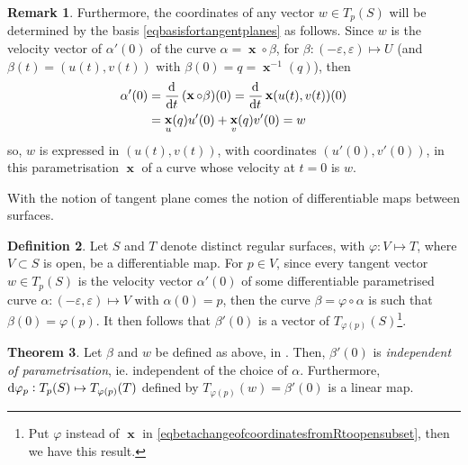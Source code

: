\documentclass{amsart} %
\renewcommand{\epsilon}{\varepsilon}
\theoremstyle{mytheoremstyle}
\theoremstyle{definition}
\newtheorem{definition}{Definition}[section]
\newtheorem{theorem}[definition]{Theorem}
\newtheorem{remark}[definition]{Remark}
\numberwithin{equation}{section}
\DeclareMathOperator{\1}{\mathbbm{1}}
\DeclareMathOperator{\D}{\dif}
\DeclareMathOperator{\x}{\mathbf{x}}
\renewcommand{\epsilon}{\varepsilon}
\renewcommand{\phi}{\varphi}
\renewcommand{\epsilon}{\varepsilon}
\renewcommand{\phi}{\varphi}
\begin{document}
\begin{remark}
	Furthermore, the coordinates of any vector $w \in T_p (S)$ will be determined by the basis \eqref{eqbasisfortangentplanes} as follows. Since $w$ is the velocity vector of $\alpha'(0)$ of the curve $\alpha = \x \circ \beta$, for $\beta:(-\epsilon,\epsilon) \mapsto U$ (and $\beta(t) = (u(t),v(t))$ with $\beta(0) = q = \x^{-1}(q)$), then
	\begin{align}
		\nonumber \alpha'(0) &= \dod{}{t} (\x \circ \beta) (0) = \dod{}{t} \x( u(t), v(t) ) (0)  \\
		\label{eqwincoordinatechartsbasis} &= \x_u (q) u'(0) + \x_v (q) v'(0) = w
	\end{align}
	so, $w $ is expressed in $(u(t),v(t))$, with coordinates $(u'(0),v'(0))$, in this parametrisation $\x$ of a curve whose velocity at $t=0$ is $w$.
\end{remark}

With the notion of tangent plane comes the notion of differentiable maps between surfaces.

\begin{definition}
	\label{defdifferentialmapsbetweensurfaces}
	Let $S$ and $T$ denote distinct regular surfaces, with $\phi: V \mapsto T$, where $V\subset S$ is open, be a differentiable map. For $p \in V$, since every tangent vector $w \in T_p(S)$ is the velocity vector $\alpha'(0)$ of some differentiable parametrised curve $\alpha:(-\epsilon,\epsilon) \mapsto V$ with $\alpha(0) = p$, then the curve $\beta = \phi \circ \alpha$ is such that $\beta(0) = \phi(p)$. It then follows that $\beta'(0)$ is a vector of $T_{\phi(p)}(S)$\footnote{Put $\phi$ instead of $\x$ in \eqref{eqbetachangeofcoordinatesfromRtoopensubset}, then we have this result.}.
\end{definition}

\begin{theorem}
	\label{thmtangentofchangedcoordinatesindepofparametrisation}
	Let $\beta$ and $w$ be defined as above, in . Then, $\beta'(0)$ is \textit{independent of parametrisation}, ie. independent of the choice of $\alpha$. Furthermore, $\D \phi_p : T_p(S) \mapsto T_{\phi(p)} (T)$ defined by $ T_{\phi(p)} (w) = \beta'(0)$ is a linear map.
\end{theorem}
\end{document}
